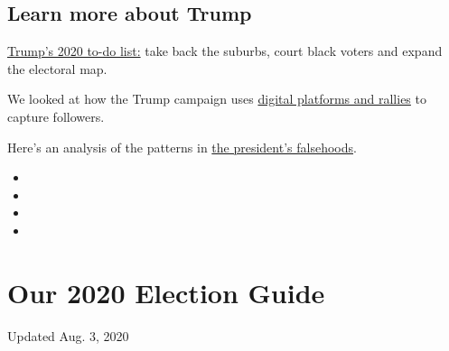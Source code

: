 \hypertarget{learn-more-about-trump}{%
\subsection{Learn more about Trump}\label{learn-more-about-trump}}

\href{https://www.nytimes.com/2020/02/08/us/politics/trump-reelection-campaign.html}{Trump's
2020 to-do list:} take back the suburbs, court black voters and expand
the electoral map.

We looked at how the Trump campaign uses
\href{https://www.nytimes.com/2020/02/27/us/politics/trump-rally-campaign-data.html}{digital
platforms and rallies} to capture followers.

Here's an analysis of the patterns in
\href{https://www.nytimes.com/2018/12/29/us/politics/trump-fact-check.html}{the
president's falsehoods}.

\begin{itemize}
\item
\item
\item
\item
\end{itemize}

\hypertarget{our-2020-election-guide}{%
\section{Our 2020 Election Guide}\label{our-2020-election-guide}}

Updated Aug. 3, 2020

